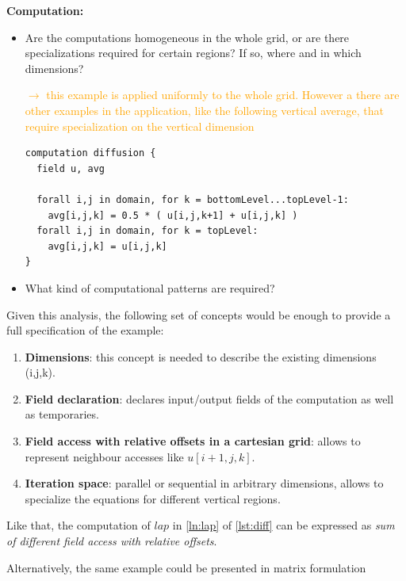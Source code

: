 \documentclass[a4paper,10pt]{scrartcl}
\begin{document}
\textbf{Computation:}\newline
\begin{itemize}
	\item Are the computations homogeneous in the whole grid, or are there specializations required for certain regions?
	If so, where and in which dimensions?
	
	\textcolor{orange}{$\rightarrow$ this example is applied uniformly to the whole grid. However a there are other
	examples in the application, like the following vertical average, that require specialization on the vertical dimension}
	
	\begin{lstlisting}
computation diffusion {
  field u, avg
  
  forall i,j in domain, for k = bottomLevel...topLevel-1:
    avg[i,j,k] = 0.5 * ( u[i,j,k+1] + u[i,j,k] )
  forall i,j in domain, for k = topLevel:
    avg[i,j,k] = u[i,j,k]
}
	\end{lstlisting}
	
	\item What kind of computational patterns are required? 
\end{itemize}

Given this analysis, the following set of concepts would be enough to provide a full specification of the example: 

\begin{enumerate}[label=\textbf{C.\arabic*}]
  \item \textbf{Dimensions}: this concept is needed to describe the existing dimensions (i,j,k).
  \item \textbf{Field declaration}: declares input/output fields of the computation as well as temporaries.
  \item \textbf{Field access with relative offsets in a cartesian grid}: allows to represent neighbour accesses like $u[i+1,j,k]$. \label{C:FieldAccess}
  \item \textbf{Iteration space}: parallel or sequential in arbitrary dimensions, allows to specialize the equations for different vertical regions.
\end{enumerate}

Like that, the computation of $lap$ in \cref{ln:lap} of \cref{lst:diff} can be expressed as \textit{sum of different field access with relative offsets}.

Alternatively, the same example could be presented in matrix formulation
\end{document}
